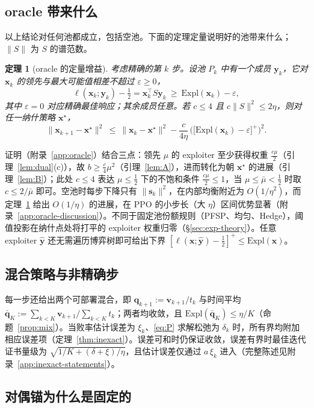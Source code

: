 \documentclass{article}
\theoremstyle{plain}
\newtheorem{theorem}{定理}[section]
\theoremstyle{remark}
\newcommand{\Expl}{\mathrm{Expl}}
\newcommand{\bx}{{\bm{x}}}
\newcommand{\by}{{\bm{y}}}
\newcommand{\bv}{{\bm{v}}}
\newcommand{\bq}{{\bm{q}}}
\newcommand{\xs}{\bx^{\star}}
\newcommand{\dx}{{\bm{s}}}
\begin{document}
\subsection{oracle 带来什么}
\label{sec:oracle-rate}

以上结论对任何池都成立，包括空池。下面的定理定量说明好的池带来什么；$\|S\|$ 为 $S$ 的谱范数。

\begin{theorem}[oracle 的定量增益]
\label{thm:oracle}
考虑精确的第 $k$ 步。设池 $P_k$ 中有一个成员 $\by_k$，它对 $\bx_k$ 的领先与最大可能值相差不超过 $\varepsilon\ge0$，
\[
\ell(\bx_k;\by_k)-\tfrac12=\bx_k^\top S\by_k\ \ge\ \Expl(\bx_k)-\varepsilon ,
\]
其中 $\varepsilon=0$ 对应精确最佳响应；其余成员任意。若 $c\le4$ 且 $c\|S\|^2\le2\eta$，则对任一纳什策略 $\xs$，
\[
\|\bx_{k+1}-\xs\|^2\ \le\ \|\bx_k-\xs\|^2-\frac{c}{4\eta}\,\Big(\big[\Expl(\bx_k)-\varepsilon\big]^+\Big)^2 .
\]
\end{theorem}
证明（附录~\ref{app:oracle}）结合三点：领先 $\mu$ 的 exploiter 至少获得权重 $\tfrac{c\mu}2$（引理~\ref{lem:dual}(c)），故 $b\ge\tfrac c4\mu^2$（引理~\ref{lem:A}），进而转化为朝 $\xs$ 的进展（引理~\ref{lem:B}）；此处 $c\le4$ 表达 $\mu\le\tfrac12$ 下的不饱和条件 $\tfrac{c\mu}2\le1$，当 $\mu\le\bar\mu<\tfrac12$ 时取 $c\le2/\bar\mu$ 即可。空池时每步下降只有 $\|\dx_k\|^2$，在内部均衡附近为 $O(1/\eta^2)$，而定理~\ref{thm:oracle} 给出 $O(1/\eta)$ 的进展，在 PPO 的小步长（大 $\eta$）区间优势显著（附录~\ref{app:oracle-discussion}）。不同于固定池份额规则（PFSP、均匀、Hedge），阈值投影在纳什点处将打平的 exploiter 权重归零（\S\ref{sec:exp-theory}）。任意 exploiter $\hat\by$ 还无需遍历博弈树即可给出下界 $[\ell(\bx;\hat\by)-\tfrac12]^+\le\Expl(\bx)$。

\subsection{混合策略与非精确步}
\label{sec:inexact}

每一步还给出两个可部署混合，即 $\bq_{k+1}:=\bv_{k+1}/t_k$ 与时间平均 $\bar\bq_K:=\sum_{k<K}\bv_{k+1}/\sum_{k<K}t_k$；两者均收敛，且 $\Expl(\bar\bq_K)\le\eta/K$（命题~\ref{prop:mix}）。当败率估计误差为 $\xi_k$、\eqref{eq:P} 求解松弛为 $\delta_k$ 时，所有界均附加相应误差项（定理~\ref{thm:inexact}）。误差可和时仍保证收敛，误差有界时最佳迭代证书量级为 $\sqrt{1/K+(\delta+\xi)/\eta}$，且估计误差仅通过 $a\,\xi_k$ 进入（完整陈述见附录~\ref{app:inexact-statements}）。

\subsection{对偶锚为什么是固定的}
\label{sec:coda}
\end{document}
